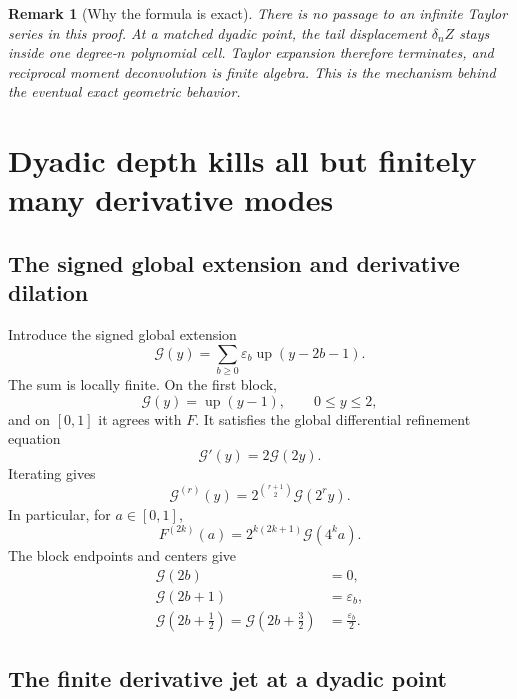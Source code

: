 \documentclass[11pt]{article}
\newtheorem{remark}[theorem]{Remark}
\newcommand{\upf}{\operatorname{up}}
\newcommand{\eps}{\varepsilon}
\newcommand{\G}{\mathcal{G}}
\begin{document}
\begin{remark}[Why the formula is exact]
There is no passage to an infinite Taylor series in this proof.  At a matched
dyadic point, the tail displacement $\delta_nZ$ stays inside one degree-$n$
polynomial cell.  Taylor expansion therefore terminates, and reciprocal
moment deconvolution is finite algebra.  This is the mechanism behind the
eventual exact geometric behavior.
\end{remark}

\section{Dyadic depth kills all but finitely many derivative modes}

\subsection{The signed global extension and derivative dilation}

Introduce the signed global extension
\begin{equation}
 \G(y)=\sum_{b\ge0}\eps_b\upf(y-2b-1).
 \label{eq:global-extension}
\end{equation}
The sum is locally finite.  On the first block,
\begin{equation}
 \G(y)=\upf(y-1),\qquad 0\le y\le2,
 \label{eq:first-block}
\end{equation}
and on $[0,1]$ it agrees with $F$.  It satisfies the global differential
refinement equation \cite{arias2018,proveit}
\begin{equation}
 \G'(y)=2\G(2y).
 \label{eq:G-diffeq}
\end{equation}
Iterating gives
\begin{equation}
 \G^{(r)}(y)=2^{\binom{r+1}{2}}\G(2^ry).
 \label{eq:G-derivatives}
\end{equation}
In particular, for $a\in[0,1]$,
\begin{equation}
 F^{(2k)}(a)=2^{k(2k+1)}\G(4^ka).
 \label{eq:F-even-derivative}
\end{equation}
The block endpoints and centers give
\begin{align}
 \G(2b)&=0, \\
 \G(2b+1)&=\eps_b, \\
 \G\!\left(2b+\frac12\right)
 =\G\!\left(2b+\frac32\right)&=\frac{\eps_b}{2}.
 \label{eq:G-integer-half-values}
\end{align}

\subsection{The finite derivative jet at a dyadic point}
\end{document}
